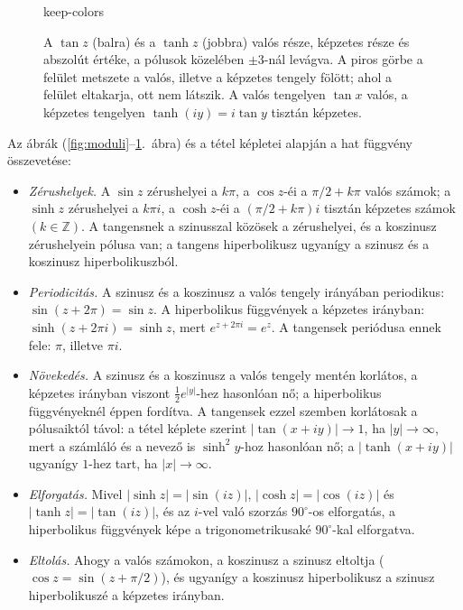 \documentclass[11pt]{scrartcl}
\newcommand{\complexpanel}[2]{\directlua{complexpanel("#1", "#2")}}
\theoremstyle{definition}
\theoremstyle{remark}
\begin{document}
\begin{figure}[p]
	\centering
	\begin{BlockClass}{keep-colors}
	\end{BlockClass}
	\caption{A $\tan z$ (balra) és a $\tanh z$ (jobbra) valós része, képzetes
		része és abszolút értéke, a pólusok közelében $\pm 3$-nál
		levágva. A piros görbe a felület metszete a valós, illetve a képzetes tengely
		fölött; ahol a felület eltakarja, ott nem látszik. A valós tengelyen $\tan x$ valós, a
		képzetes tengelyen $\tanh(iy) = i \tan y$ tisztán képzetes.}
	\label{fig:tangent-surfaces}
\end{figure}

Az ábrák (\ref{fig:moduli}--\ref{fig:tangent-surfaces}.~ábra) és a tétel
képletei alapján a hat függvény összevetése:
\begin{itemize}
	\item \emph{Zérushelyek.} A $\sin z$ zérushelyei a $k\pi$, a $\cos z$-éi a
	      $\pi/2 + k\pi$ valós számok; a $\sinh z$ zérushelyei a $k\pi i$, a
	      $\cosh z$-éi a $(\pi/2 + k\pi)i$ tisztán képzetes számok
	      $(k \in \mathbb{Z})$. A tangensnek a szinusszal közösek a
	      zérushelyei, és a koszinusz zérushelyein pólusa van; a tangens
	      hiperbolikusz ugyanígy a szinusz és a koszinusz hiperbolikuszból.
	\item \emph{Periodicitás.} A szinusz és a koszinusz a valós tengely
	      irányában periodikus: $\sin(z + 2\pi) = \sin z$. A hiperbolikus
	      függvények a képzetes irányban: $\sinh(z + 2\pi i) = \sinh z$, mert
	      $e^{z + 2\pi i} = e^z$. A tangensek periódusa ennek fele: $\pi$,
	      illetve $\pi i$.
	\item \emph{Növekedés.} A szinusz és a koszinusz a valós tengely mentén
	      korlátos, a képzetes irányban viszont $\frac{1}{2}e^{|y|}$-hez
	      hasonlóan nő; a hiperbolikus függvényeknél éppen fordítva. A
	      tangensek ezzel szemben korlátosak a pólusaiktól távol: a tétel
	      képlete szerint $|\tan(x + iy)| \to 1$, ha $|y| \to \infty$, mert
	      a számláló és a nevező is $\sinh^2 y$-hoz hasonlóan nő; a
	      $|\tanh(x + iy)|$ ugyanígy $1$-hez tart, ha $|x| \to \infty$.
	\item \emph{Elforgatás.} Mivel $|\sinh z| = |\sin(iz)|$,
	      $|\cosh z| = |\cos(iz)|$ és $|\tanh z| = |\tan(iz)|$, és az $i$-vel való szorzás $90^\circ$-os
	      elforgatás, a hiperbolikus függvények képe a trigonometrikusaké
	      $90^\circ$-kal elforgatva.
	\item \emph{Eltolás.} Ahogy a valós számokon, a koszinusz a szinusz
	      eltoltja ($\cos z = \sin(z + \pi/2)$), és ugyanígy a koszinusz
	      hiperbolikusz a szinusz hiperbolikuszé a képzetes irányban.
\end{itemize}
\end{document}
